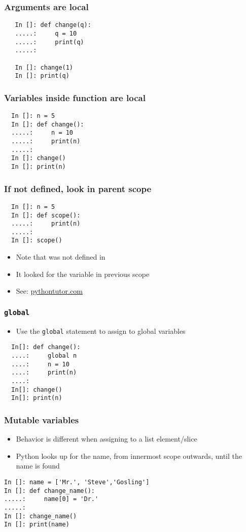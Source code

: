 \documentclass[14pt,compress]{beamer}
\begin{document}
\begin{frame}[fragile]
  \frametitle{Arguments are local}
  \begin{lstlisting}
   In []: def change(q):
   .....:     q = 10
   .....:     print(q)
   .....:

   In []: change(1)
   In []: print(q)
  \end{lstlisting}
\end{frame}

\begin{frame}[fragile]
  \frametitle{Variables inside function are local}
  \begin{lstlisting}
  In []: n = 5
  In []: def change():
  .....:     n = 10
  .....:     print(n)
  .....:
  In []: change()
  In []: print(n)
  \end{lstlisting}
\end{frame}

\begin{frame}[fragile]
  \frametitle{If not defined, look in parent scope}
  \begin{lstlisting}
  In []: n = 5
  In []: def scope():
  .....:     print(n)
  .....:
  In []: scope()
\end{lstlisting}
\begin{itemize}
\item Note that  was not defined in 
\item It looked for the variable in previous scope
\item See: \url{pythontutor.com}
\end{itemize}
\end{frame}

\begin{frame}[fragile]
  \frametitle{\texttt{global}}
 \begin{itemize}
  \item Use the \texttt{global} statement to assign to global variables
  \end{itemize}
  \begin{lstlisting}
  In[]: def change():
  ....:     global n
  ....:     n = 10
  ....:     print(n)
  ....:
  In[]: change()
  In[]: print(n)
  \end{lstlisting}
\end{frame}

\begin{frame}[fragile]
  \frametitle{Mutable variables}
  \begin{itemize}
  \item Behavior is different when assigning to a list element/slice
  \item Python looks up for the name, from innermost scope outwards,
    until the name is found
  \end{itemize}
  \begin{lstlisting}
In []: name = ['Mr.', 'Steve','Gosling']
In []: def change_name():
.....:     name[0] = 'Dr.'
.....:
In []: change_name()
In []: print(name)
  \end{lstlisting}
\end{frame}
\end{document}
